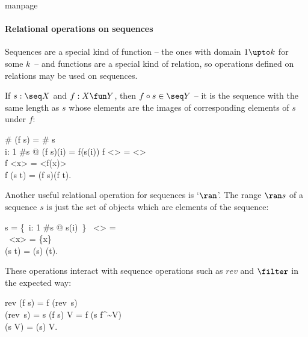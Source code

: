 \begin{pagestyle}{manpage}\label{p:4090}
\paragraph{Relational operations on sequences}

Sequences are a special kind of
function -- the ones with domain $1 \upto k$ for some $k$~-- and
functions are a special kind of
relation, so operations defined on relations may be used on
sequences.

If $s: \seq X$ and $f: X \fun Y$, then $f \circ s \in \seq Y$ -- it is the sequence with the same
length as $s$ whose elements are the images of corresponding elements
of $s$ under $f$:
\begin{laws}
        \# (f \circ s) = \# s \\
        \forall i: 1 \upto \#s @ (f \circ s)(i) = f(s(i))
\also
        f \circ <> = <> \\
        f \circ <x> = <f(x)> \\
        f \circ (s \cat t) = (f \circ s)\cat(f \circ t).
\end{laws}
Another useful relational operation for sequences is 
`$\ran$'. The
range $\ran s$ of a sequence $s$ is just the set of objects which
are elements of the sequence:
\begin{laws}
        \ran s = \{~i: 1 \upto \#s @ s(i)~\}
\also
        \ran~<> = \empty \\
        \ran~<x> = \{x\} \\
        \ran (s \cat t) = (\ran s) \cup (\ran t).
\end{laws}
These operations interact with sequence operations such as 
$rev$ and $\filter$ in the expected way:
\begin{laws}
        rev (f \circ s) = f \circ (rev~s) \\
        \ran (rev~s) = \ran s
\also
        (f \circ s) \filter V = f \circ (s \filter f^\sim\limg V\rimg) \\
        \ran (s \filter V) = (\ran s) \cap V.
\end{laws}
\newpage
\end{pagestyle}
